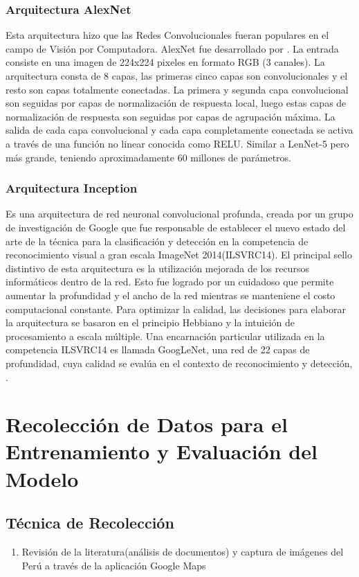 		\subsubsection{Arquitectura AlexNet} 
			Esta arquitectura hizo que las Redes Convolucionales fueran populares en el campo de Visión por Computadora. AlexNet fue desarrollado por \citep{Krizhevsky2012}. La entrada consiste en una imagen de 224x224 pixeles en formato RGB (3 canales). La arquitectura consta de 8 capas, las primeras cinco capas son convolucionales y el resto son capas totalmente conectadas. La primera y segunda capa convolucional son seguidas por capas de normalización de respuesta local, luego estas capas de normalización de respuesta son seguidas por capas de agrupación máxima. La salida de cada capa convolucional y cada capa completamente conectada se activa a través de  una función no linear conocida como RELU. Similar a LenNet-5\citep{LeCun} pero más grande, teniendo aproximadamente 60 millones de parámetros.

		\subsubsection{Arquitectura Inception}  
			Es una arquitectura de red neuronal convolucional profunda, creada por un grupo de investigación de Google que fue responsable de establecer el nuevo estado del arte de la técnica para la clasificación y detección en la competencia de reconocimiento visual a gran escala ImageNet 2014(ILSVRC14). 
			\vskip 0.1cm
			El principal sello distintivo de esta arquitectura es la utilización mejorada de los recursos informáticos dentro de la red. Esto fue logrado por un cuidadoso que permite aumentar la profundidad y el ancho de la red mientras se manteniene el costo computacional constante. Para optimizar la calidad, las decisiones para elaborar la arquitectura se basaron en el principio Hebbiano y la intuición de procesamiento a escala múltiple. Una encarnación particular utilizada en la competencia ILSVRC14 es llamada GoogLeNet, una red de 22 capas de profundidad, cuya calidad se evalúa en el contexto de reconocimiento y detección, \citep{Inception}.

		
	\section{Recolección de Datos para el Entrenamiento y Evaluación del Modelo}
		\subsection{Técnica de Recolección}
		\begin{enumerate}		
			\item[]  Revisión de la literatura(análisis de documentos) y captura de imágenes del Perú a través de la aplicación Google Maps
		\end{enumerate}

